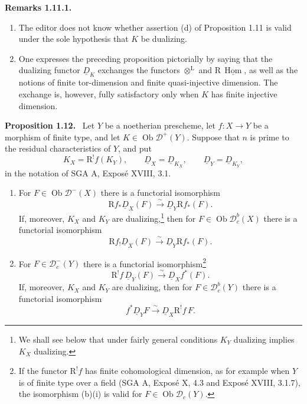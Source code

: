 \documentclass[11pt]{article}
\theoremstyle{plain}
\theoremstyle{definition}
\theoremstyle{remark}
\newenvironment{statement}[1]{\par\medskip\noindent\textbf{#1.}\ }{\par\medskip}
\newcommand{\D}{\mathcal D}\newcommand{\E}{\mathcal E}\newcommand{\F}{\mathcal F}
\DeclareMathOperator{\Hom}{Hom}
\DeclareMathOperator{\ob}{Ob}
\newcommand{\R}{\mathrm R}
\begin{document}
\begin{statement}{Remarks 1.11.1}
\begin{enumerate}[label=\alph*)]
\item The editor does not know whether assertion (d) of Proposition 1.11 is valid under the sole hypothesis that $K$ be dualizing.
\item One expresses the preceding proposition pictorially by saying that the dualizing functor $\underline D_K$ exchanges the functors $\otimes^{\mathrm L}$ and $\R\,\underline{\Hom}$, as well as the notions of finite tor-dimension and finite quasi-injective dimension. The exchange is, however, fully satisfactory only when $K$ has finite injective dimension.
\end{enumerate}
\end{statement}

\begin{statement}{Proposition 1.12}
Let $Y$ be a noetherian prescheme, let $f:X\to Y$ be a morphism of finite type, and let $K\in\ob\D^+(Y)$. Suppose that $n$ is prime to the residual characteristics of $Y$, and put
\[
   K_X=\R^!f(K_Y),\qquad \underline D_X=\underline D_{K_X},\qquad \underline D_Y=\underline D_{K_Y},
\]
in the notation of SGA A, Exposé XVIII, 3.1.
\begin{enumerate}[label=\alph*)]
\item For $F\in\ob\D^-(X)$ there is a functorial isomorphism
\[
   \R f_*\underline D_X(F)\xrightarrow{\sim}\underline D_Y\R f_*(F).\tag{i}
\]
If, moreover, $K_X$ and $K_Y$ are dualizing,\footnote{We shall see below that under fairly general conditions $K_Y$ dualizing implies $K_X$ dualizing.} then for $F\in\ob\D_c^b(X)$ there is a functorial isomorphism
\[
   \R f_!\underline D_X(F)\xrightarrow{\sim}\underline D_Y\R f_*(F).\tag{ii}
\]

\item For $F\in\D_c^-(Y)$ there is a functorial isomorphism\footnote{If the functor $\R^!f$ has finite cohomological dimension, as for example when $Y$ is of finite type over a field (SGA A, Exposé X, 4.3 and Exposé XVIII, 3.1.7), the isomorphism (b)(i) is valid for $F\in\ob\D_c(Y)$.}
\[
   \R^!f\,\underline D_Y(F)\xrightarrow{\sim}\underline D_X f^*(F).\tag{i}
\]
If, moreover, $K_X$ and $K_Y$ are dualizing, then for $F\in\D_c^b(Y)$ there is a functorial isomorphism
\[
   f^*\underline D_YF\xrightarrow{\sim}\underline D_X\R^!f\,F.\tag{ii}
\]
\end{enumerate}
\end{statement}
\end{document}
